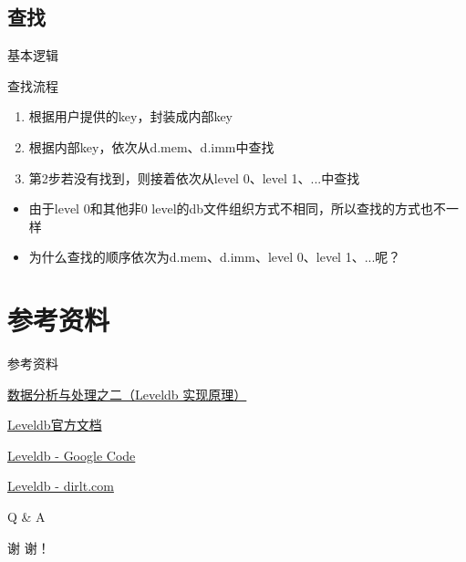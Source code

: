 \documentclass[CJK, 8pt]{beamer}
\begin{document}
\begin{CJK*}{UTF8}{gkai}
\subsection{查找}
\begin{frame}{基本逻辑}
\begin{block}{查找流程}
\begin{enumerate}
\item 根据用户提供的key，封装成内部key
\item 根据内部key，依次从d.mem、d.imm中查找
\item 第2步若没有找到，则接着依次从level 0、level 1、...中查找
\end{enumerate}
\end{block}
\begin{block}{}
\begin{itemize}
\item 由于level 0和其他非0 level的db文件组织方式不相同，所以查找的方式也不一样
\item 为什么查找的顺序依次为d.mem、d.imm、level 0、level 1、...呢？
\end{itemize}
\end{block}
\end{frame}

\section{参考资料}
\begin{frame}{参考资料}
\begin{itemize}
{\color{blue}
\item \href{http://www.cnblogs.com/haippy/archive/2011/12/04/2276064.html}{数据分析与处理之二（Leveldb 实现原理）}
\item \href{http://leveldb.googlecode.com/svn/trunk/doc/index.html}{Leveldb官方文档}
\item \href{https://code.google.com/p/leveldb/}{Leveldb - Google Code}
\item \href{http://dirlt.com/leveldb.html}{Leveldb - dirlt.com}
}
\end{itemize}
\end{frame}

\begin{frame}{Q \& A}
\begin{center}
谢 谢！
\end{center}
\end{frame}
\end{CJK*}
\end{document}
